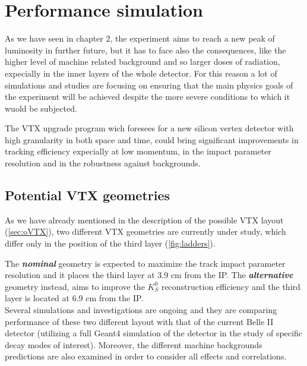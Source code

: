 \section{Performance simulation}


As we have seen in chapter 2, the experiment aims to reach a new peak of luminosity in further future, but it has to face also the consequences, like the higher level of machine related background and so larger doses of radiation, expecially in the inner layers of the whole detector. 
For this reason a lot of simulations and studies are focusing on ensuring that the main physics goals of the experiment will be achieved despite the more severe conditions to which it wuold be subjected. 

The VTX upgrade program wich foresees for a new silicon vertex detector with high granularity in both space and time, could bring significant improvements in tracking efficiency expecially at low momentum, in the impact parameter resolution and in the robustness against backgrounds. 


\subsection{Potential VTX geometries}

As we have already mentioned in the description of the possible VTX layout (\autoref{sec:oVTX}), two different VTX geometries are currently under study, which differ only in the position of the third layer (\autoref{fig:ladders}).  

The \textit{\textbf{nominal}} geometry is expected to maximize the track impact parameter resolution and it places the third layer at 3.9 cm from the IP.
The \textit{\textbf{alternative}} geometry instead, aims to improve the $K_{S}^{0}$ reconstruction efficiency and the third layer is located at 6.9 cm from the IP.\\

Several simulations and investigations are ongoing and they are comparing performance of these two different layout with that of the current Belle II detector (utilizing a full Geant4 simulation of the detector in the study of specific decay modes of interest). Moreover, the different machine backgrounds predictions are also examined in order to consider all effects and correlations. 

